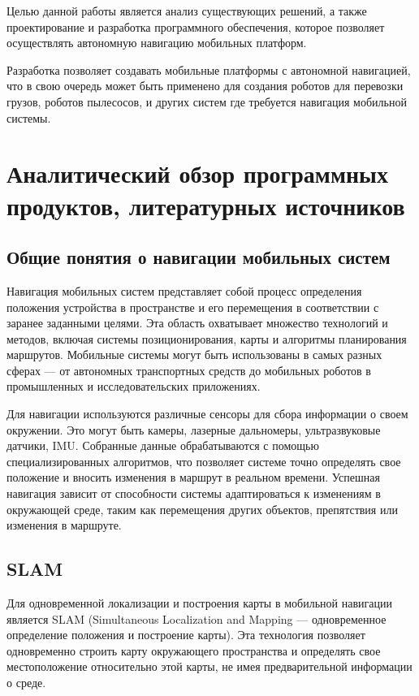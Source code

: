 Целью данной работы является анализ существующих решений, а также
проектирование и разработка программного обеспечения, которое позволяет
осуществлять автономную навигацию мобильных платформ.

Разработка \diplomanameR{} позволяет создавать мобильные платформы с автономной
навигацией, что в свою очередь может быть применено для создания роботов для
перевозки грузов, роботов пылесосов, и других систем где требуется навигация
мобильной системы.

\section{Аналитический обзор программных продуктов, литературных источников}

\subsection{Общие понятия о навигации мобильных систем}

Навигация мобильных систем представляет собой процесс определения положения
устройства в пространстве и его перемещения в соответствии с заранее заданными
целями. Эта область охватывает множество технологий и методов, включая системы
позиционирования, карты и алгоритмы планирования маршрутов. Мобильные системы
могут быть использованы в самых разных сферах — от автономных транспортных
средств до мобильных роботов в промышленных и исследовательских приложениях.

Для навигации используются различные сенсоры для сбора информации о
своем окружении. Это могут быть камеры, лазерные дальномеры, ультразвуковые
датчики, IMU. Собранные данные обрабатываются с помощью
специализированных алгоритмов, что позволяет системе точно определять свое
положение и вносить изменения в маршрут в реальном времени. Успешная навигация
зависит от способности системы адаптироваться к изменениям в окружающей среде,
таким как перемещения других объектов, препятствия или изменения в маршруте.

\subsection{SLAM}

Для одновременной локализации и построения карты в мобильной навигации является
SLAM (Simultaneous Localization and Mapping — одновременное определение
положения и построение карты). Эта технология позволяет одновременно строить
карту окружающего пространства и определять свое местоположение относительно
этой карты, не имея предварительной информации о среде.

